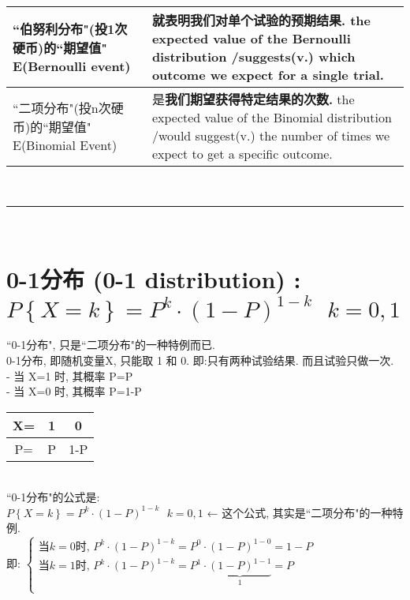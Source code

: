 \documentclass[UTF8]{ctexart}
\begin{document}
	
	\begin{tabular}{|p{}|p{}|}
		\hline
		 ``伯努利分布"(投1次硬币)的``期望值" E(Bernoulli event) &  就\textbf{表明我们对单个试验的预期结果.} the expected value of the Bernoulli distribution /suggests(v.) which outcome we expect for a single trial.\\
		\hline
		``二项分布"(投n次硬币)的``期望值" E(Binomial Event) &  是\textbf{我们期望获得特定结果的次数.} the expected value of the Binomial distribution /would suggest(v.) the number of times we expect to get a specific outcome. \\
		\hline
	\end{tabular}

	
	
	
	
	
	~\\
	\hrule
	~\\
	
	
	
	\section{0-1分布 (0-1 distribution) : $ P\left\{ X=k \right\} =P^k\cdot \left( 1-P \right) ^{1-k}\ \ \ k=0,1 $}
	
	``0-1分布", 只是``二项分布"的一种特例而已. \\
	
		0-1分布, 即随机变量X, 只能取 1 和 0.  即:只有两种试验结果. 而且试验只做一次. \\		
		- 当 X=1 时, 其概率 P=P \\
		- 当 X=0 时, 其概率 P=1-P \\
		
		\begin{tabular}{|c|c|c|}
			\hline
			X= & 1 & 0 \\
			\hline
			P= & P & 1-P \\
			\hline
		\end{tabular} \\
	
		``0-1分布"的公式是: \\
		$ \boxed{
		P\left\{ X=k \right\} =P^k\cdot \left( 1-P \right) ^{1-k}\ \ \ k=0,1
		}	$ 	← 这个公式, 其实是``二项分布"的一种特例. \\
	
	即: $ \left\{ \begin{array}{l}
			\text{当}k=0\text{时,\ }P^k\cdot \left( 1-P \right) ^{1-k}=P^0\cdot \left( 1-P \right) ^{1-0}=1-P\\
			\text{当}k=1\text{时,\ }P^k\cdot \left( 1-P \right) ^{1-k}=P^1\cdot \underset{1}{\underbrace{\left( 1-P \right) ^{1-1}}}=P\\
		\end{array} \right. $ \\
	\vspace{1em} 
	
\end{document}
